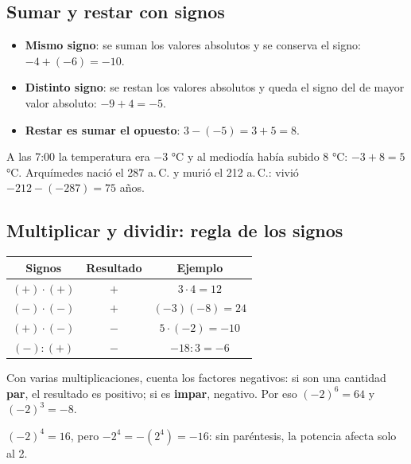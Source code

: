 \subsection{Sumar y restar con signos}
\begin{itemize}
  \item \textbf{Mismo signo}: se suman los valores absolutos y se conserva el signo: $-4 + (-6) = -10$.
  \item \textbf{Distinto signo}: se restan los valores absolutos y queda el signo del de mayor valor absoluto: $-9 + 4 = -5$.
  \item \textbf{Restar es sumar el opuesto}: $3 - (-5) = 3 + 5 = 8$.
\end{itemize}
\begin{ejemplo}[En contexto] A las 7:00 la temperatura era $-3$ °C y al mediodía había subido 8 °C: $-3 + 8 = 5$ °C. Arquímedes nació el 287 a.\,C. y murió el 212 a.\,C.: vivió $-212 - (-287) = 75$ años.\end{ejemplo}

\subsection{Multiplicar y dividir: regla de los signos}
\begin{center}
\begin{tabular}{ccc}
\toprule Signos & Resultado & Ejemplo\\ \midrule
$(+)\cdot(+)$ & $+$ & $3\cdot 4 = 12$\\
$(-)\cdot(-)$ & $+$ & $(-3)(-8) = 24$\\
$(+)\cdot(-)$ & $-$ & $5\cdot(-2) = -10$\\
$(-) : (+)$ & $-$ & $-18 : 3 = -6$\\ \bottomrule
\end{tabular}
\end{center}
Con varias multiplicaciones, cuenta los factores negativos: si son una cantidad \textbf{par}, el resultado es positivo; si es \textbf{impar}, negativo. Por eso $(-2)^6 = 64$ y $(-2)^3 = -8$.
\begin{ojo} $(-2)^4 = 16$, pero $-2^4 = -(2^4) = -16$: sin paréntesis, la potencia afecta solo al 2.\end{ojo}

